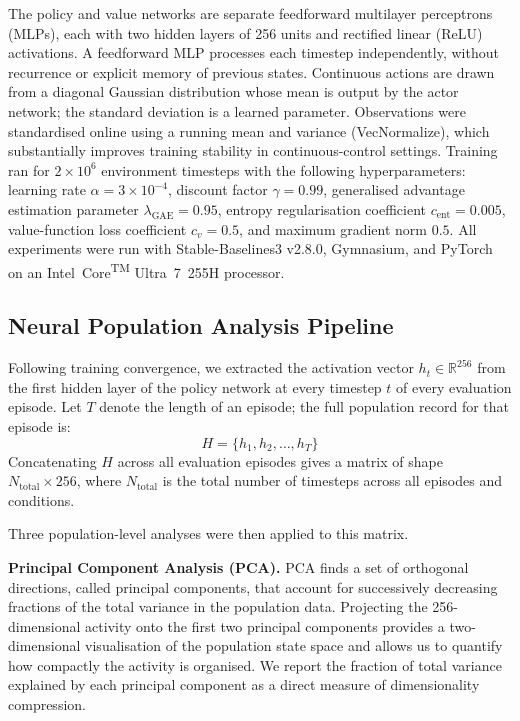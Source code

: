 \documentclass{article}
\begin{document}
The policy and value networks are separate feedforward multilayer
perceptrons (MLPs), each with two hidden layers of 256 units and
rectified linear (ReLU) activations.
A feedforward MLP processes each timestep independently, without recurrence
or explicit memory of previous states.
Continuous actions are drawn from a diagonal Gaussian distribution whose
mean is output by the actor network; the standard deviation is a learned
parameter.
Observations were standardised online using a running mean and variance
(VecNormalize), which substantially improves training stability in
continuous-control settings.
Training ran for $2\times10^6$ environment timesteps with the following
hyperparameters: learning rate $\alpha = 3\times10^{-4}$, discount factor
$\gamma = 0.99$, generalised advantage estimation parameter
$\lambda_{\mathrm{GAE}} = 0.95$, entropy regularisation coefficient
$c_{\mathrm{ent}} = 0.005$, value-function loss coefficient $c_v = 0.5$,
and maximum gradient norm $0.5$.
All experiments were run with Stable-Baselines3 v2.8.0, Gymnasium,
and PyTorch on an Intel\textregistered\ Core\textsuperscript{TM} Ultra~7~255H
processor.

\subsection{Neural Population Analysis Pipeline}

Following training convergence, we extracted the activation vector
$h_t \in \mathbb{R}^{256}$ from the first hidden layer of the policy
network at every timestep $t$ of every evaluation episode.
Let $T$ denote the length of an episode; the full population record for
that episode is:
\begin{equation}
  H = \{h_1, h_2, \ldots, h_T\}
  \label{eq:latent}
\end{equation}
Concatenating $H$ across all evaluation episodes gives a matrix of
shape $N_{\mathrm{total}} \times 256$, where $N_{\mathrm{total}}$ is the
total number of timesteps across all episodes and conditions.

Three population-level analyses were then applied to this matrix.

\textbf{Principal Component Analysis (PCA).}
PCA finds a set of orthogonal directions, called principal components, that
account for successively decreasing fractions of the total variance in
the population data.
Projecting the 256-dimensional activity onto the first two principal
components provides a two-dimensional visualisation of the population
state space and allows us to quantify how compactly the activity is
organised.
We report the fraction of total variance explained by each principal
component as a direct measure of dimensionality compression.
\end{document}
